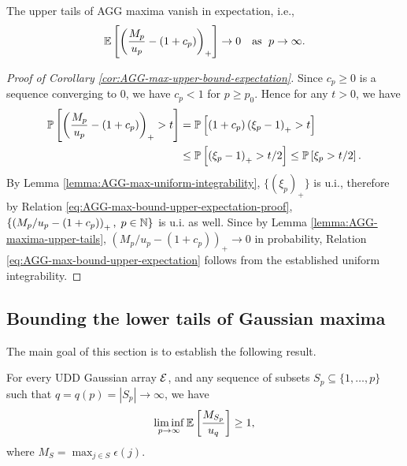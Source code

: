 \begin{corollary} \label{cor:AGG-max-upper-bound-expectation}
The upper tails of AGG maxima vanish in expectation, i.e.,
    \begin{equation} \label{eq:AGG-max-bound-upper-expectation}
    \E\left[\left(\frac{M_p}{u_p} - (1+c_p)\right)_+\right]
    \to 0 \quad\text{as }\; p\to\infty.
\end{equation}
\end{corollary}

\begin{proof}[Proof of Corollary \ref{cor:AGG-max-upper-bound-expectation}]
Since $c_p\ge0$ is a sequence converging to 0, we have $c_p < 1$ for $p \ge p_0$. Hence for any $t>0$, we have
\begin{align}
    \P\left[\left(\frac{M_p}{u_p} - (1+c_p)\right)_+ > t\right] 
    &= \P\left[(1+c_p)\left(\xi_p-1\right)_+ > t\right] \nonumber \\
    &\le \P\left[\left(\xi_p-1\right)_+ > t/2\right] 
    \le \P\left[\xi_p > t/2 \right]. \label{eq:AGG-max-bound-upper-expectation-proof}
\end{align}
By Lemma \ref{lemma:AGG-max-uniform-integrability}, $\{\left(\xi_p\right)_+\}$ is u.i., therefore by Relation \eqref{eq:AGG-max-bound-upper-expectation-proof}, $\{\left(M_p/u_p - (1+c_p)\right)_+,\;p\in\mathbb N\}$ is u.i. as well.
Since by Lemma \ref{lemma:AGG-maxima-upper-tails}, $\left(M_p/u_p - (1+c_p)\right)_+\to 0$ in probability, Relation \eqref{eq:AGG-max-bound-upper-expectation} follows from the established uniform integrability.
\end{proof}


\subsection{Bounding the lower tails of Gaussian maxima}
\label{subsec:bounding-lower-tails-of-maxima}

The main goal of this section is to establish the following result. 

\begin{proposition} \label{prop:Gaussian-maxima-expectation-lower-bound}
For every UDD Gaussian array $\cal E$, and any sequence of subsets
$S_p\subseteq\{1,\ldots,p\}$ such that $q = q(p) = |S_p|\to \infty$, we have
\begin{equation} \label{eq:AGG-max-bound-expectation}
    \liminf_{p\to\infty} \E\left[\frac{M_{S_p}}{u_q}\right] \ge 1,
\end{equation}
where $M_S = \max_{j\in S}\epsilon(j)$.
\end{proposition}

